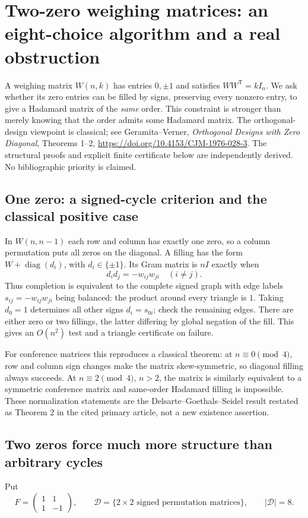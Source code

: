 \section{Two-zero weighing matrices: an eight-choice algorithm and a real obstruction}
\label{sec:weighing-fill}

A weighing matrix $W(n,k)$ has entries $0,\pm1$ and satisfies
$WW^{\mathsf T}=kI_n$. We ask whether its zero entries can be
filled by signs, preserving every nonzero entry, to give a Hadamard
matrix of the \emph{same} order. This constraint is stronger than
merely knowing that the order admits some Hadamard matrix.
The orthogonal-design viewpoint is classical; see Geramita--Verner,
\emph{Orthogonal Designs with Zero Diagonal}, Theorems 1--2,
\url{https://doi.org/10.4153/CJM-1976-028-3}.
The structural proofs and explicit finite certificate below are
independently derived. No bibliographic priority is claimed.

\subsection{One zero: a signed-cycle criterion and the classical positive case}
In $W(n,n-1)$ each row and column has exactly one zero, so a column
permutation puts all zeros on the diagonal. A filling has the form
$W+\operatorname{diag}(d_i)$, with $d_i\in\{\pm1\}$. Its Gram
matrix is $nI$ exactly when
\[
 d_id_j=-w_{ij}w_{ji}\quad(i\ne j).
\]
Thus completion is equivalent to the complete signed graph with edge
labels $s_{ij}=-w_{ij}w_{ji}$ being balanced: the product around every
triangle is $1$. Taking $d_0=1$ determines all other signs
$d_i=s_{0i}$; check the remaining edges. There are either zero or
two fillings, the latter differing by global negation of the fill.
This gives an $O(n^2)$ test and a triangle certificate on failure.

For conference matrices this reproduces a classical theorem:
at $n\equiv0\pmod4$, row and column sign changes make the matrix
skew-symmetric, so diagonal filling always succeeds. At
$n\equiv2\pmod4$, $n>2$, the matrix is similarly equivalent to a
symmetric conference matrix and same-order Hadamard filling is
impossible. These normalization statements are the
Delsarte--Goethals--Seidel result restated as Theorem 2 in the cited
primary article, not a new existence assertion.

\subsection{Two zeros force much more structure than arbitrary cycles}
Put
\[
 F=\begin{pmatrix}1&1\\1&-1\end{pmatrix},\qquad
 \mathcal D=\{2\times2\text{ signed permutation matrices}\},
 \qquad|\mathcal D|=8.
\]

